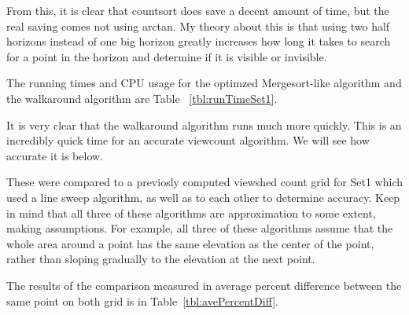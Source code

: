 \documentclass[11pt,twocolumn]{article}
\begin{document}
From this, it is clear that countsort does save a decent amount of time, but the real saving comes not using arctan.  My theory about this is that using two half horizons instead of one big horizon greatly increases how long it takes to search for a point in the horizon and determine if it is visible or invisible.

The running times and CPU usage for the optimzed Mergesort-like algorithm and the walkaround algorithm are Table ~\ref{tbl:runTimeSet1}.

\begin{table}[htp]
  \caption{Running times (seconds) and CPU-utilization.}
  \label{tbl:runTimeSet1}
\end{table}

It is very clear that the walkaround algorithm runs much more quickly.  This is an incredibly quick time for an accurate viewcount algorithm.  We will see how accurate it is below.

These were compared to a previosly computed viewshed count grid for Set1 which used a line sweep algorithm, as well as to each other to determine accuracy.  Keep in mind that all three of these algorithms are approximation to some extent, making assumptions.  For example, all three of these algorithms assume that the whole area around a point has the same elevation as the center of the point, rather than sloping gradually to the elevation at the next point.

The results of the comparison measured in average percent difference between the same point on both grid is in Table~\ref{tbl:avePercentDiff}.

\begin{table}[htp]
      \caption{Accuracy commparison between various algorithms on set1.}
      \label{tbl:avePercentDiff}
\end{table}
\end{document}
